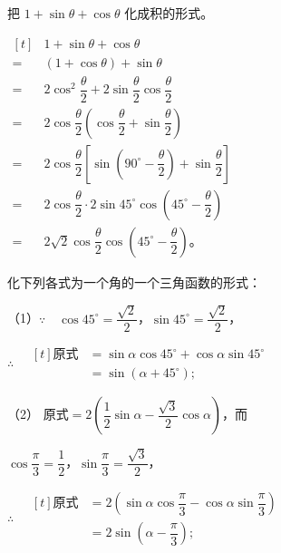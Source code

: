 \liti 把 $1 + \sin\theta + \cos\theta$ 化成积的形式。

\jie $\begin{aligned}[t]
    & 1 + \sin\theta + \cos\theta \\
    = & (1 + \cos\theta) + \sin\theta \\
    = & 2\cos^2\dfrac{\theta}{2} + 2\sin\dfrac{\theta}{2} \cos\dfrac{\theta}{2} \\
    = & 2\cos\dfrac{\theta}{2} \left( \cos\dfrac{\theta}{2} + \sin\dfrac{\theta}{2} \right) \\
    = & 2\cos\dfrac{\theta}{2} \left[ \sin\left( 90^\circ - \dfrac{\theta}{2} \right) + \sin\dfrac{\theta}{2} \right] \\
    = & 2\cos\dfrac{\theta}{2} \cdot 2\sin45^\circ \cos\left( 45^\circ - \dfrac{\theta}{2} \right) \\
    = & 2\sqrt{2} \cos\dfrac{\theta}{2} \cos\left( 45^\circ - \dfrac{\theta}{2} \right) \text{。}
\end{aligned}$ \jiange

\liti 化下列各式为一个角的一个三角函数的形式：\jiange
\begin{xiaoxiaotis}

    \jiange



\end{xiaoxiaotis}

\jie （1）$\because \quad \cos45^\circ = \dfrac{\sqrt{2}}{2}$，$\sin45^\circ = \dfrac{\sqrt{2}}{2}$，

$\therefore \quad \begin{aligned}[t]
    \text{原式} &= \sin\alpha \cos45^\circ + \cos\alpha \sin45^\circ \\
    &= \sin(\alpha + 45^\circ);
\end{aligned}$

（2） $\text{原式} = 2\left( \dfrac{1}{2}\sin\alpha  - \dfrac{\sqrt{3}}{2}\cos\alpha \right)$，而\jiange

\qquad $\cos\dfrac{\pi}{3} = \dfrac{1}{2}$，$\sin\dfrac{\pi}{3} = \dfrac{\sqrt{3}}{2}$，\jiange

$\therefore \quad \begin{aligned}[t]
    \text{原式} &= 2\left( \sin\alpha \cos\dfrac{\pi}{3} - \cos\alpha \sin\dfrac{\pi}{3} \right) \\
    &= 2\sin\left( \alpha - \dfrac{\pi}{3} \right);
\end{aligned}$

